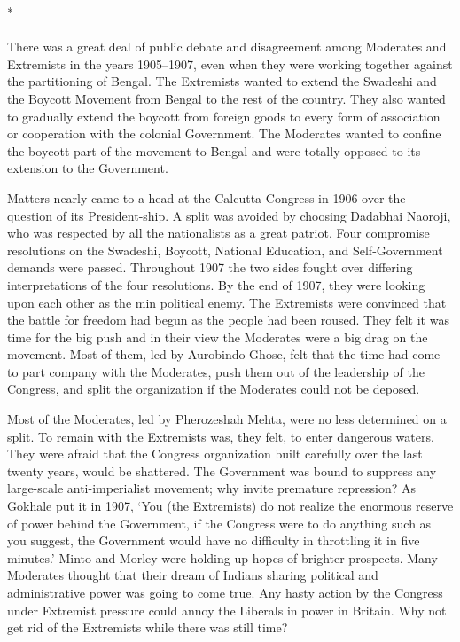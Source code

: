 \begin{center}*\end{center}

\paragraph*{}

There was a great deal of public debate and disagreement among Moderates and Extremists in the years 1905--1907, even when they were working together against the partitioning of Bengal. The Extremists wanted to extend the Swadeshi and the Boycott Movement from Bengal to the rest of the country. They also wanted to gradually extend the boycott from foreign goods to every form of association or cooperation with the colonial Government. The Moderates wanted to confine the boycott part of the movement to Bengal and were totally opposed to its extension to the Government.

Matters nearly came to a head at the Calcutta Congress in 1906 over the question of its President-ship. A split was avoided by choosing Dadabhai Naoroji, who was respected by all the nationalists as a great patriot. Four compromise resolutions on the Swadeshi, Boycott, National Education, and Self-Government demands were passed. Throughout 1907 the two sides fought over differing interpretations of the four resolutions. By the end of 1907, they were looking upon each other as the min political enemy. The Extremists were convinced that the battle for freedom had begun as the people had been roused. They felt it was time for the big push and in their view the Moderates were a big drag on the movement. Most of them, led by Aurobindo Ghose, felt that the time had come to part company with the Moderates, push them out of the leadership of the Congress, and split the organization if the Moderates could not be deposed.

Most of the Moderates, led by Pherozeshah Mehta, were no less determined on a split. To remain with the Extremists was, they felt, to enter dangerous waters. They were afraid that the Congress organization built carefully over the last twenty years, would be shattered. The Government was bound to suppress any large-scale anti-imperialist movement; why invite premature repression? As Gokhale put it in 1907, `You (the Extremists) do not realize the enormous reserve of power behind the Government, if the Congress were to do anything such as you suggest, the Government would have no difficulty in throttling it in five minutes.' Minto and Morley were holding up hopes of brighter prospects. Many Moderates thought that their dream of Indians sharing political and administrative power was going to come true. Any hasty action by the Congress under Extremist pressure could annoy the Liberals in power in Britain. Why not get rid of the Extremists while there was still time?

